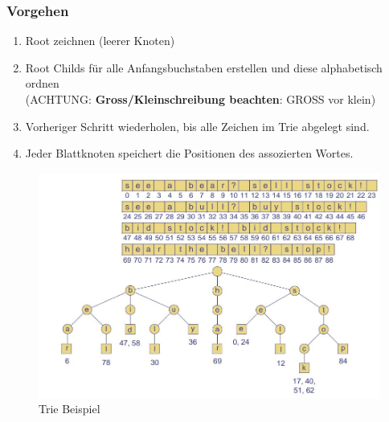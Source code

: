 \subsubsection{Vorgehen}
\begin{enumerate}
	\item Root zeichnen (leerer Knoten)
	\item Root Childs für alle Anfangsbuchstaben erstellen und diese alphabetisch ordnen \\ (ACHTUNG: \textbf{Gross/Kleinschreibung beachten}: GROSS vor klein)
	\item Vorheriger Schritt wiederholen, bis alle Zeichen im Trie abgelegt sind.
	\item Jeder Blattknoten speichert die Positionen des assozierten Wortes.
\end{enumerate}

\begin{figure}[h]
\centering
\includegraphics[width=0.8\linewidth]{images/trie_example}
\caption{Trie Beispiel}
\label{fig:trieexample}
\end{figure}


